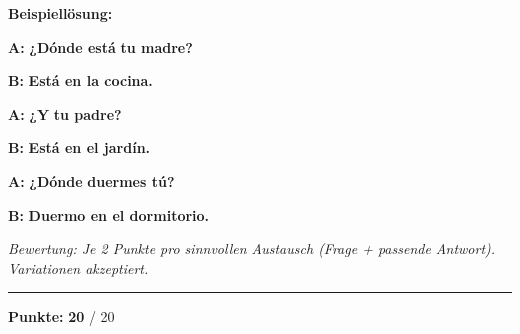 \documentclass[11pt, a4paper]{article}
\newcommand{\fachfarbe}{spanisch}
\newcommand{\maxpunkte}{20}
\newcommand{\loesung}[1]{\textcolor{loesung}{\textbf{#1}}}
\newcommand{\es}[1]{\textcolor{\fachfarbe}{\textbf{#1}}}
\begin{document}
\vspace{0.8em}

\textbf{Beispiellösung:}

\vspace{0.5em}

\noindent
\textbf{A:} \es{¿Dónde está} \loesung{tu madre}\es{?}

\vspace{0.5em}

\noindent
\textbf{B:} \loesung{Está en la cocina.}

\vspace{0.8em}

\noindent
\textbf{A:} \es{¿Y} \loesung{tu padre}\es{?}

\vspace{0.5em}

\noindent
\textbf{B:} \loesung{Está en el jardín.}

\vspace{0.8em}

\noindent
\textbf{A:} \es{¿Dónde} \loesung{duermes tú}\es{?}

\vspace{0.5em}

\noindent
\textbf{B:} \loesung{Duermo en el dormitorio.}

\vspace{1em}

\textit{\textcolor{grau}{Bewertung: Je 2 Punkte pro sinnvollen Austausch (Frage + passende Antwort). Variationen akzeptiert.}}


\vspace{20pt}
\hrule
\vspace{10pt}

\begin{flushright}
\textbf{Punkte:} \loesung{\maxpunkte} / \maxpunkte
\end{flushright}
\end{document}
